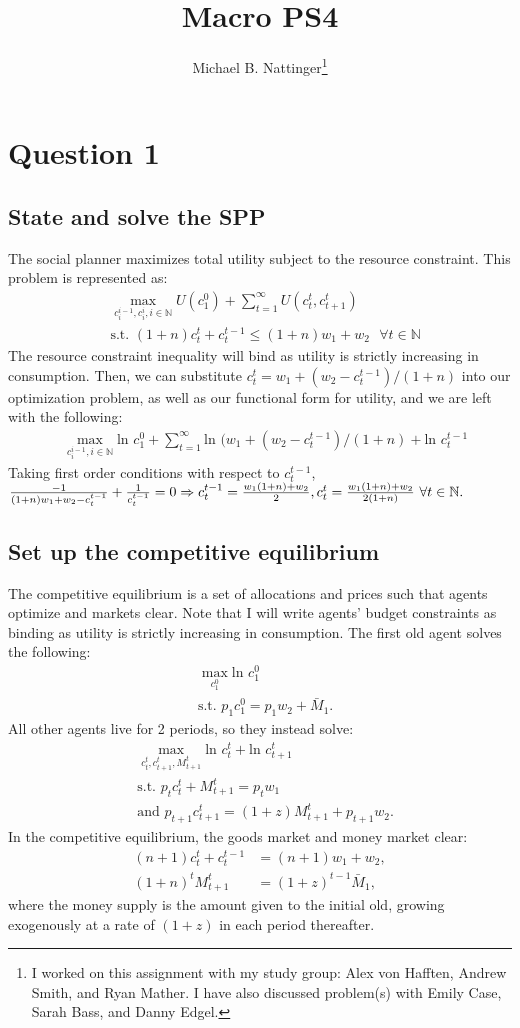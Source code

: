 \documentclass[11pt]{article} %
\title{Macro PS4}
\author{Michael B. Nattinger\footnote{I worked on this assignment with my study group: Alex von Hafften, Andrew Smith, and Ryan Mather. I have also discussed problem(s) with Emily Case, Sarah Bass, and Danny Edgel.}}
\begin{document}
\maketitle

\section{Question 1}
\subsection{State and solve the SPP}
The social planner maximizes total utility subject to the resource constraint. This problem is represented as:
\begin{align*}
&\max_{c_{i}^{i-1},c_i^i, i \in \mathbb{N}} U(c_1^0) + \sum_{t=1}^{\infty} U(c_t^t,c_{t+1}^t)\\
&\text{s.t. } (1+n)c_t^t +c_t^{t-1} \leq (1+n)w_1 + w_2 \text{ } \forall t \in \mathbb{N}
\end{align*}
The resource constraint inequality will bind as utility is strictly increasing in consumption. Then, we can substitute $c_t^t = w_1+(w_2-c_t^{t-1})/(1+n)$ into our optimization problem, as well as our functional form for utility, and we are left with the following:
\begin{align*}
&\max_{c_{i}^{i-1}, i \in \mathbb{N}} \text{ln }c_1^0 + \sum_{t=1}^{\infty} \text{ln }(w_1+(w_2-c_t^{t-1})/(1+n) + \text{ln }c_{t}^{t-1}
\end{align*}
Taking first order conditions with respect to $c_t^{t-1}$, $\frac{-1}{(1+n)w_1+w_2-c_t^{t-1}} + \frac{1}{c_t^{t-1}} = 0 \\ \Rightarrow c_t^{t-1} = \frac{w_1(1+n)+w_2}{2}, c_t^t = \frac{w_1(1+n)+w_2}{2(1+n)} \text{ } \forall t \in \mathbb{N}.$ 
\subsection{Set up the competitive equilibrium}
The competitive equilibrium is a set of allocations and prices such that agents optimize and markets clear. Note that I will write agents' budget constraints as binding as utility is strictly increasing in consumption. The first old agent solves the following:
\begin{align*}
&\max_{c_1^0} \text{ln } c_1^0 \\
&\text{s.t. } p_1c_1^0 = p_1w_2 + \bar{M}_1.
\end{align*}
All other agents live for 2 periods, so they instead solve:
\begin{align*}
&\max_{c_t^t,c_{t+1}^t,M_{t+1}^t} \text{ln } c_t^t + \text{ln } c_{t+1}^t \\
&\text{s.t. } p_tc_t^t + M^t_{t+1}= p_tw_1 \\
&\text{and } p_{t+1}c_{t+1}^t = (1+z)M_{t+1}^t  + p_{t+1}w_2.
\end{align*}
In the competitive equilibrium, the goods market and money market clear:
\begin{align*}
(n+1)c_t^t +c_t^{t-1} &= (n+1)w_1 + w_2, \\
(1+n)^tM_{t+1}^t  &= (1+z)^{t-1}\bar{M}_1,
\end{align*}
where the money supply is the amount given to the initial old, growing exogenously at a rate of $(1+z)$ in each period thereafter.
\end{document}
